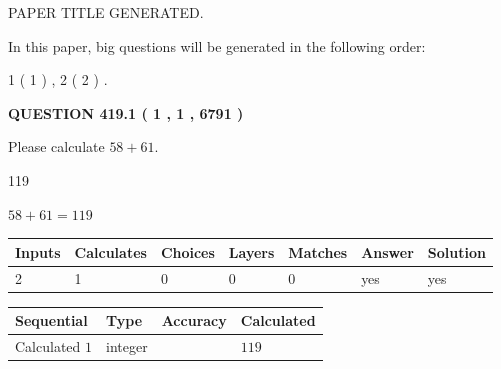 \documentclass[12pt]{article}
\begin{document}
 
 
 
   
   
 PAPER TITLE GENERATED.
   
   
   
\vspace{0.2in}
   
In this paper, big questions will be generated in the following order: 
   
   
   1 ( 1 )
 ,
   2 ( 2 )
 .
  
\vspace{0.2in}
  
{\textbf{\Large{QUESTION
419.1 
 ( 1 , 1 , 6791 )
}}}
  
  
 
Please calculate $ %
58 +  %
61 $.
 
 
 
\noindent{}
 
 

119
 
 
\noindent{}
 
 

 
 
 
\noindent{}
 
 

$ %
58 +  %
61=   %
119$
 
 
\noindent{}
 
 

 
   
   
   
   
\noindent\begin{tabular}{|l|l|l|l|l|l|l|}
 \hline
Inputs & Calculates & Choices & Layers & Matches & Answer & Solution \\ \hline
 2  & 
 1  & 
 0
  & 
 0  & 
 0  & 
  yes & 
  yes 
  \\ \hline
 \end{tabular}
   
   
   
   
\noindent{}
   
   
  
  
\noindent\begin{tabular}{|l|l|l|l|}
\hline
 Sequential & Type & Accuracy & Calculated \\ 
\hline
 
 
  Calculated $  1 $ & integer &  & 
  $ 119 $ 
 \\  \hline  
 \end{tabular}
   
\end{document}
